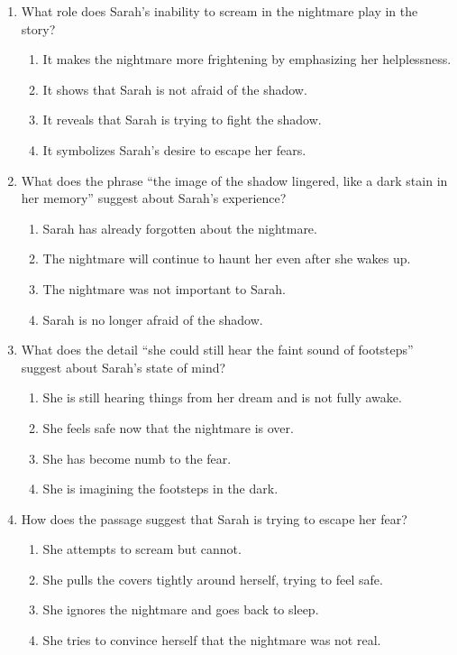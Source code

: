 \documentclass[12pt]{article}
\begin{document}
\begin{enumerate}
    \item What role does Sarah’s inability to scream in the nightmare play in the story?
    \begin{enumerate}[label=\Alph*.]
        \item It makes the nightmare more frightening by emphasizing her helplessness.
        \item It shows that Sarah is not afraid of the shadow.
        \item It reveals that Sarah is trying to fight the shadow.
        \item It symbolizes Sarah’s desire to escape her fears.
    \end{enumerate}
    \vspace{0.5cm}

    \item What does the phrase “the image of the shadow lingered, like a dark stain in her memory” suggest about Sarah’s experience?
    \begin{enumerate}[label=\Alph*.]
        \item Sarah has already forgotten about the nightmare.
        \item The nightmare will continue to haunt her even after she wakes up.
        \item The nightmare was not important to Sarah.
        \item Sarah is no longer afraid of the shadow.
    \end{enumerate}
    \vspace{0.5cm}

    \item What does the detail “she could still hear the faint sound of footsteps” suggest about Sarah’s state of mind?
    \begin{enumerate}[label=\Alph*.]
        \item She is still hearing things from her dream and is not fully awake.
        \item She feels safe now that the nightmare is over.
        \item She has become numb to the fear.
        \item She is imagining the footsteps in the dark.
    \end{enumerate}
    \vspace{0.5cm}

    \item How does the passage suggest that Sarah is trying to escape her fear?
    \begin{enumerate}[label=\Alph*.]
        \item She attempts to scream but cannot.
        \item She pulls the covers tightly around herself, trying to feel safe.
        \item She ignores the nightmare and goes back to sleep.
        \item She tries to convince herself that the nightmare was not real.
    \end{enumerate}
    \vspace{0.5cm}


\end{enumerate}
\end{document}
